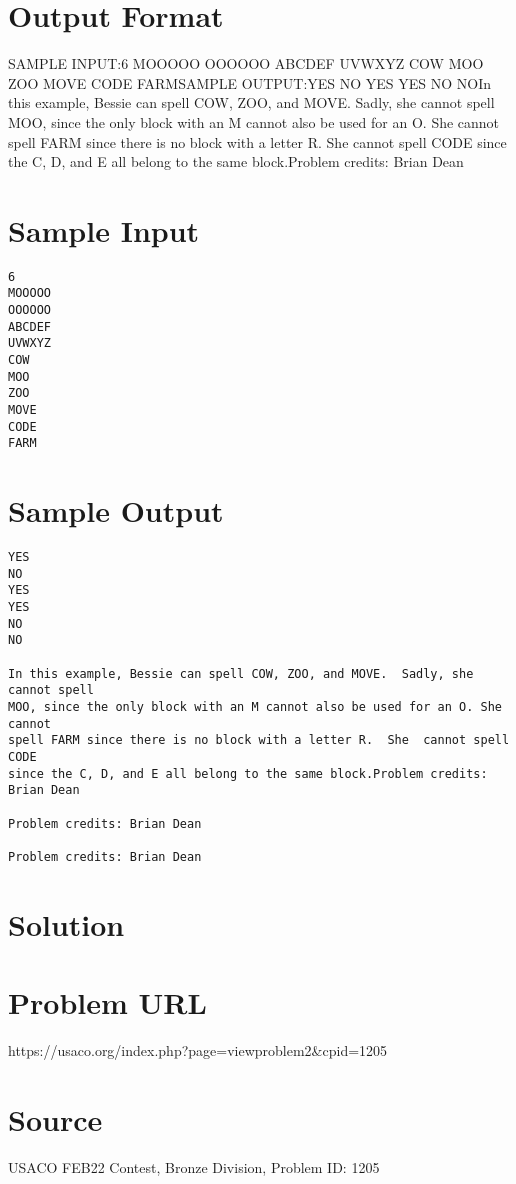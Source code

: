 \documentclass[12pt]{article}
\begin{document}
\section*{Output Format}
SAMPLE INPUT:6
MOOOOO
OOOOOO
ABCDEF
UVWXYZ
COW
MOO
ZOO
MOVE
CODE
FARMSAMPLE OUTPUT:YES
NO
YES
YES
NO
NOIn this example, Bessie can spell COW, ZOO, and MOVE.  Sadly, she cannot spell
MOO, since the only block with an M cannot also be used for an O. She cannot
spell FARM since there is no block with a letter R.  She  cannot spell CODE
since the C, D, and E all belong to the same block.Problem credits: Brian Dean

\section*{Sample Input}
\begin{verbatim}
6
MOOOOO
OOOOOO
ABCDEF
UVWXYZ
COW
MOO
ZOO
MOVE
CODE
FARM
\end{verbatim}

\section*{Sample Output}
\begin{verbatim}
YES
NO
YES
YES
NO
NO

In this example, Bessie can spell COW, ZOO, and MOVE.  Sadly, she cannot spell
MOO, since the only block with an M cannot also be used for an O. She cannot
spell FARM since there is no block with a letter R.  She  cannot spell CODE
since the C, D, and E all belong to the same block.Problem credits: Brian Dean

Problem credits: Brian Dean

Problem credits: Brian Dean
\end{verbatim}

\section*{Solution}


\section*{Problem URL}
https://usaco.org/index.php?page=viewproblem2&cpid=1205

\section*{Source}
USACO FEB22 Contest, Bronze Division, Problem ID: 1205
\end{document}

